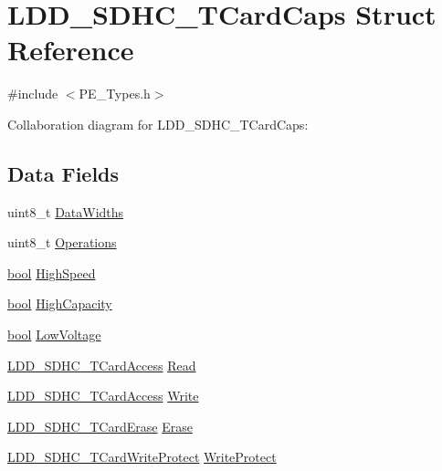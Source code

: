 \hypertarget{struct_l_d_d___s_d_h_c___t_card_caps}{}\section{L\+D\+D\+\_\+\+S\+D\+H\+C\+\_\+\+T\+Card\+Caps Struct Reference}
\label{struct_l_d_d___s_d_h_c___t_card_caps}


{\ttfamily \#include $<$P\+E\+\_\+\+Types.\+h$>$}



Collaboration diagram for L\+D\+D\+\_\+\+S\+D\+H\+C\+\_\+\+T\+Card\+Caps\+:
\subsection*{Data Fields}
\begin{DoxyCompactItemize}
\item 
uint8\+\_\+t \hyperlink{struct_l_d_d___s_d_h_c___t_card_caps_ad3efc837d31b53ceb05bb493c5a60c80}{Data\+Widths}
\item 
uint8\+\_\+t \hyperlink{struct_l_d_d___s_d_h_c___t_card_caps_a84cee2e15fdb67f7f98ae012d8c9f268}{Operations}
\item 
\hyperlink{group___p_e___types__module_ga97a80ca1602ebf2303258971a2c938e2}{bool} \hyperlink{struct_l_d_d___s_d_h_c___t_card_caps_aa9583131f385bca483cad126ae763961}{High\+Speed}
\item 
\hyperlink{group___p_e___types__module_ga97a80ca1602ebf2303258971a2c938e2}{bool} \hyperlink{struct_l_d_d___s_d_h_c___t_card_caps_a2a9e3f4c5675746ebe166bf09acc1cc8}{High\+Capacity}
\item 
\hyperlink{group___p_e___types__module_ga97a80ca1602ebf2303258971a2c938e2}{bool} \hyperlink{struct_l_d_d___s_d_h_c___t_card_caps_aad76812bd754014055bea46043992792}{Low\+Voltage}
\item 
\hyperlink{struct_l_d_d___s_d_h_c___t_card_access}{L\+D\+D\+\_\+\+S\+D\+H\+C\+\_\+\+T\+Card\+Access} \hyperlink{struct_l_d_d___s_d_h_c___t_card_caps_a7c6dd192919744c09c982a7b3c72965c}{Read}
\item 
\hyperlink{struct_l_d_d___s_d_h_c___t_card_access}{L\+D\+D\+\_\+\+S\+D\+H\+C\+\_\+\+T\+Card\+Access} \hyperlink{struct_l_d_d___s_d_h_c___t_card_caps_a997a0766d91af68ac02e376ca5933685}{Write}
\item 
\hyperlink{struct_l_d_d___s_d_h_c___t_card_erase}{L\+D\+D\+\_\+\+S\+D\+H\+C\+\_\+\+T\+Card\+Erase} \hyperlink{struct_l_d_d___s_d_h_c___t_card_caps_a469b9a0fadafc18507213797b846232a}{Erase}
\item 
\hyperlink{struct_l_d_d___s_d_h_c___t_card_write_protect}{L\+D\+D\+\_\+\+S\+D\+H\+C\+\_\+\+T\+Card\+Write\+Protect} \hyperlink{struct_l_d_d___s_d_h_c___t_card_caps_a4900bef5123e165646fe1f68a983dd55}{Write\+Protect}
\end{DoxyCompactItemize}


